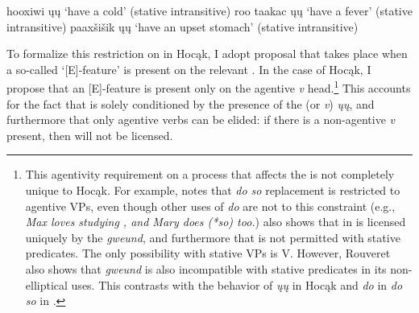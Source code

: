 \documentclass[output=paper]{LSP/langsci}
\begin{document}
 
\ea\label{ex:johnson:23}
\ea 
hooxiwi ųų `have a cold' (stative intransitive)
\vspace{12pt}
\ex 
roo taakac ųų `have a fever' (stative intransitive)
\vspace{12pt}
\ex 
paaxšišik ųų `have an upset stomach' (stative intransitive)\\
\citep{Hartmann2012}
\z
\z

To formalize this restriction on  in Hocąk, I adopt  proposal that  takes place when a so-called `[E]-feature' is present on the relevant . In the case of Hocąk, I propose that an [E]-feature is present only on the agentive \emph{v} head.\footnote{This agentivity requirement on a process that affects the  is not completely unique to Hocąk. For example, \citet{Hallman2004} notes that  \emph{do so} replacement is restricted to agentive VPs, even though other uses of \emph{do} are not  to this constraint (e.g., \emph{Max loves studying , and Mary does (*so) too.}) \citet{Rouveret2012} also shows that  in  is licensed uniquely by the  \emph{gweund}, and furthermore that  is not permitted with stative predicates. The only possibility with stative VPs is V. However, Rouveret also shows that \emph{gweund} is also incompatible with stative predicates in its non-elliptical uses. This contrasts with the behavior of \emph{ųų} in Hocąk and \emph{do} in \emph{do so} in .}  This accounts for the fact that  is solely conditioned by the presence of the  (or \emph{v}) \emph{ųų}, and furthermore that only agentive verbs can be elided: if there is a non-agentive \emph{v} present, then  will not be licensed. 
\end{document}
